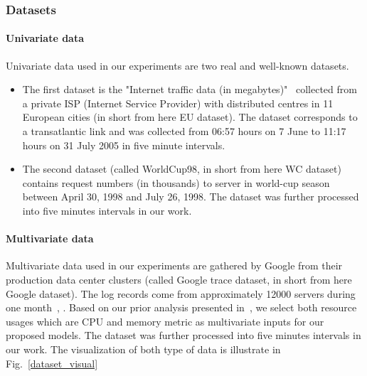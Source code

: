 \documentclass[review,3p,authoryear]{elsarticle}
\begin{document}
\subsubsection{Datasets}
\label{dataset}

\paragraph{\textbf{Univariate data}} Univariate data used in our experiments are two real and well-known datasets.
\begin{itemize}
	\item The first dataset is the "Internet traffic data (in megabytes)"~\citep{ref_cortez} collected from a private ISP (Internet Service Provider) with distributed centres in 11 European cities (in short from here EU dataset). The dataset corresponds to a transatlantic link and was collected from 06:57 hours on 7 June to 11:17 hours on 31 July 2005 in five minute intervals. 
	\item The second dataset (called WorldCup98, in short from here WC dataset) contains request numbers (in thousands) to server in world-cup season between April 30, 1998 and July 26, 1998. The dataset was further processed into five minutes intervals in our work.
\end{itemize}

\paragraph{\textbf{Multivariate data}} Multivariate data used in our experiments are gathered by Google from their production data center clusters (called Google trace dataset, in short from here Google dataset). The log records come from approximately 12000 servers during one month~\citep{ref_google_trace}, \citep{reiss2011google}. Based on our prior analysis presented in~\citep{ref_thieu}, we select both resource usages which are CPU and memory metric as multivariate inputs for our proposed models. The dataset was further processed into five minutes intervals in our work. The visualization of both type of data is illustrate in Fig.~\ref{dataset_visual}
\end{document}
